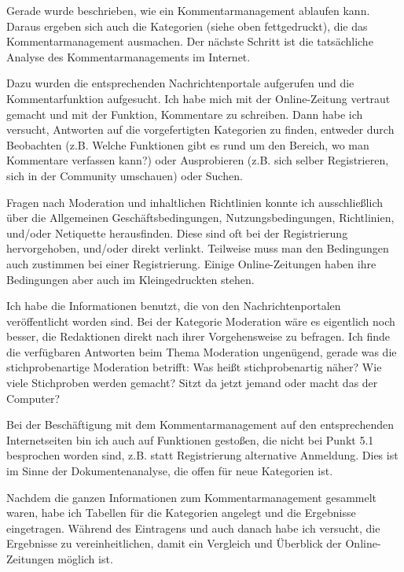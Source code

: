 \begin{itemize}
    Gerade wurde beschrieben, wie ein Kommentarmanagement ablaufen
    kann. Daraus ergeben sich auch die Kategorien (siehe oben fettgedruckt),
    die das Kommentarmanagement ausmachen.
   Der nächste Schritt ist die tatsächliche Analyse des Kommentarmanagements im 
   Internet. 
    
    Dazu wurden die entsprechenden Nachrichtenportale aufgerufen und die
    Kommentarfunktion aufgesucht. Ich habe mich mit der Online-Zeitung vertraut
    gemacht und mit der Funktion, Kommentare zu schreiben. 
    Dann habe ich versucht, Antworten auf die vorgefertigten Kategorien zu finden,
    entweder durch Beobachten (z.B. Welche Funktionen gibt es rund um den Bereich,
    wo man Kommentare verfassen kann?) oder Ausprobieren (z.B. sich selber
    Registrieren, sich in der Community umschauen) oder Suchen.
    
    Fragen nach Moderation und inhaltlichen Richtlinien konnte ich ausschließlich 
    über die Allgemeinen Geschäftsbedingungen, Nutzungsbedingungen, Richtlinien,
    und/oder Netiquette herausfinden. Diese sind oft bei der Registrierung hervorgehoben,
    und/oder direkt verlinkt. Teilweise muss man den Bedingungen auch zustimmen bei einer
    Registrierung. Einige Online-Zeitungen haben ihre Bedingungen aber auch im 
    \glqq Kleingedruckten\grqq\- stehen.
    
    Ich habe die Informationen benutzt, die von den Nachrichtenportalen veröffentlicht
    worden sind. Bei der Kategorie \glqq Moderation\grqq\- wäre es eigentlich noch besser, 
    die Redaktionen direkt nach ihrer Vorgehensweise zu befragen. Ich finde die 
    verfügbaren Antworten beim Thema Moderation ungenügend,
    gerade was die \glqq stichprobenartige\grqq\- Moderation betrifft: Was heißt stichprobenartig näher?
    Wie viele Stichproben werden gemacht? Sitzt da jetzt jemand oder macht das der Computer?
    
    Bei der Beschäftigung mit dem Kommentarmanagement auf den entsprechenden Internetseiten
    bin ich auch auf Funktionen gestoßen, die nicht bei Punkt 5.1
    besprochen worden sind, z.B. statt Registrierung \glqq alternative Anmeldung\grqq. 
    Dies ist im Sinne der Dokumentenanalyse, die offen für neue Kategorien ist.
    
    Nachdem die ganzen Informationen zum Kommentarmanagement gesammelt waren, 
    habe ich Tabellen für die Kategorien angelegt und die Ergebnisse eingetragen.
    Während des Eintragens und auch danach habe ich versucht, die Ergebnisse zu 
    vereinheitlichen, damit ein Vergleich und Überblick der Online-Zeitungen möglich ist. 
    

\end{itemize}
